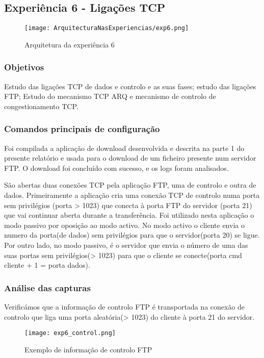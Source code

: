 \documentclass[a4paper]{article}
\begin{document}
\subsection{Experiência 6 - Ligações TCP}

\begin{figure}[h]
    \centering
    \texttt{[image: ArquitecturaNasExperiencias/exp6.png]}
    \caption{Arquitetura da experiência 6}
\end{figure}

\subsubsection{Objetivos}
Estudo das ligações TCP de dados e controlo e as suas fases; estudo das
ligações FTP; Estudo do mecanismo TCP ARQ e mecanismo de controlo de
congestionamento TCP.

\subsubsection{Comandos principais de configuração}
Foi compilada a aplicação de download desenvolvida e descrita na parte 1 do
presente relatório e usada para o download de um ficheiro presente num servidor
FTP. O download foi concluído com sucesso, e os logs foram analisados.

São abertas duas conexões TCP pela aplicação FTP, uma de controlo e outra de
dados. Primeiramente a aplicação cria uma conexão TCP de controlo numa porta
sem privilégios (porta > 1023) que conecta à porta FTP do servidor (porta 21)
que vai continuar aberta durante a transferência. Foi utilizado nesta aplicação
o modo passivo por oposição ao modo activo. No modo activo o cliente envia o
numero da porta(de dados) sem privilégios para que o servidor(porta 20) se
ligue. Por outro lado, no modo passivo, é o servidor que envia o número de uma
das suas portas sem privilégios(> 1023) para que o cliente se conecte(porta cmd
cliente + 1 = porta dados).

\subsubsection{Análise das capturas}

Verificámos que a informação de controlo FTP é transportada na conexão de
controlo que liga uma porta aleatória(> 1023) do cliente à porta 21 do
servidor.

\begin{figure}[h]
    \centering
    \texttt{[image: exp6\_control.png]}
    \caption{Exemplo de informação de controlo FTP}
\end{figure}
\end{document}
